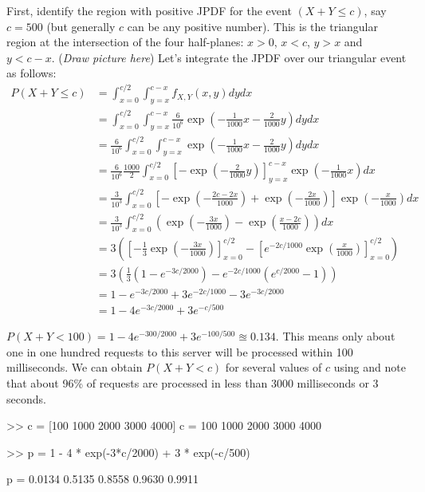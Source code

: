 \begin{example}
{}
\item
First, identify the region with positive JPDF for the event $(X+Y \leq c)$, say $c=500$ (but generally $c$ can be any positive number).
This is the triangular region at the intersection of the four half-planes: $x>0$, $x < c$, $y>x$ and $y<c-x$. ({\em Draw picture here})
Let's integrate the JPDF over our triangular event as follows:
{\scriptsize
\begin{align*}
P(X+Y \leq c) 
&= \int_{x=0}^{c/2}\int_{y=x}^{c-x} f_{X,Y}(x,y) dy dx \\
&= \int_{x=0}^{c/2}\int_{y=x}^{c-x} \frac{6}{10^6} \exp \left( -\frac{1}{1000}x-\frac{2}{1000}y \right) dy dx \\
&= \frac{6}{10^6} \int_{x=0}^{c/2}\int_{y=x}^{c-x}  \exp \left( -\frac{1}{1000}x-\frac{2}{1000}y \right) dy dx \\
&= \frac{6}{10^6} \frac{1000}{2} \int_{x=0}^{c/2} \left[ - \exp \left( -\frac{2}{1000}y \right) \right]_{y=x}^{c-x}  \exp \left(-\frac{1}{1000}x\right) dx\\
&= \frac{3}{10^3} \int_{x=0}^{c/2} \left[ - \exp \left( -\frac{2c-2x}{1000} \right) + \exp \left( -\frac{2x}{1000} \right) \right]  \exp \left(-\frac{x}{1000}\right) dx\\
&= \frac{3}{10^3} \int_{x=0}^{c/2} \left(  \exp \left( -\frac{3x}{1000} \right) - \exp \left( \frac{x-2c}{1000} \right) \right)  dx\\
&= 3 \left( \left[-\frac{1}{3} \exp \left( -\frac{3x}{1000} \right) \right]_{x=0}^{c/2} - \left[ e^{-2c/1000} \exp \left( \frac{x}{1000} \right)\right]_{x=0}^{c/2} \right)  \\
&= 3  \left(\frac{1}{3} (1-e^{-3c/2000}) - e^{-2c/1000} (e^{c/2000}-1) \right)\\
&= 1 - e^{-3c/2000} + 3 e^{-2c/1000} - 3 e^{-3c/2000}\\
&= 1 - 4 e^{-3c/2000} + 3 e^{-c/500}
\end{align*}
}
\item $P(X+Y<100) = 1 - 4 e^{-300/2000} + 3 e^{-100/500} \approxeq 0.134$.  This means only about one in one hundred requests to this server will be processed within 100 milliseconds.
\ee
We can obtain $P(X+Y<c)$ for several values of $c$ using \Matlab and note that about 96\% of requests are processed in less than 3000 milliseconds or 3 seconds.
\begin{VrbM}
>> c = [100 1000 2000 3000 4000]
c =  100        1000        2000        3000        4000

>> p = 1 - 4 * exp(-3*c/2000) + 3 * exp(-c/500)

p =  0.0134     0.5135      0.8558      0.9630      0.9911
\end{VrbM}
\end{example}

